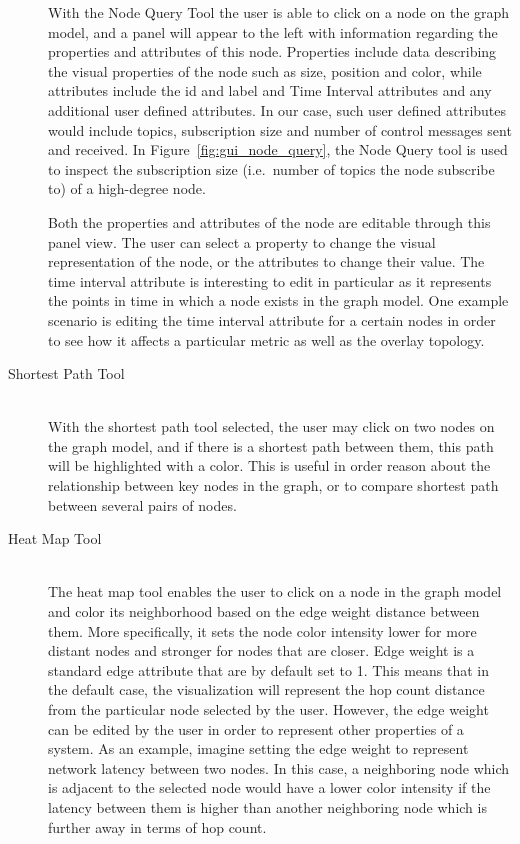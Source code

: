 \begin{description}
    With the Node Query Tool the user is able to click on a node on the
    graph model, and a panel will appear to the left with information
    regarding the properties and attributes of this node. Properties include
    data describing the visual properties of the node such as size, position
    and color, while attributes include the id and label and Time Interval
    attributes and any additional user defined attributes. In our case, such
    user defined attributes would include topics, subscription size and
    number of control messages sent and received. In
    Figure~\ref{fig:gui_node_query}, the Node Query tool is used to
    inspect the subscription size (i.e.\ number of topics the node
    subscribe to) of a high-degree node.

    Both the properties and attributes of the node are editable through this
    panel view. The user can select a property to change the visual
    representation of the node, or the attributes to change their value. The
    time interval attribute is interesting to edit in particular as it
    represents the points in time in which a node exists in the graph model.
    One example scenario is editing the time interval attribute for a certain
    nodes in order to see how it affects a particular metric as well as the
    overlay topology.

\item[Shortest Path Tool] \hfill \\

    With the shortest path tool selected, the user may click on two nodes on
    the graph model, and if there is a shortest path between them, this path
    will be highlighted with a color. This is useful in order reason about the
    relationship between key nodes in the graph, or to compare shortest path
    between several pairs of nodes.

\item[Heat Map Tool] \hfill \\

    The heat map tool enables the user to click on a node in the graph model
    and color its neighborhood based on the edge weight distance between
    them. More specifically, it sets the node color intensity lower for more
    distant nodes and stronger for nodes that are closer. Edge weight is a
    standard edge attribute that are by default set to 1. This means that in
    the default case, the visualization will represent the hop count
    distance from the particular node selected by the user. However, the
    edge weight can be edited by the user in order to represent other
    properties of a system. As an example, imagine setting the edge weight
    to represent network latency between two nodes. In this case, a
    neighboring node which is adjacent to the selected node would have a
    lower color intensity if the latency between them is higher than another
    neighboring node which is further away in terms of hop count.


\end{description}
